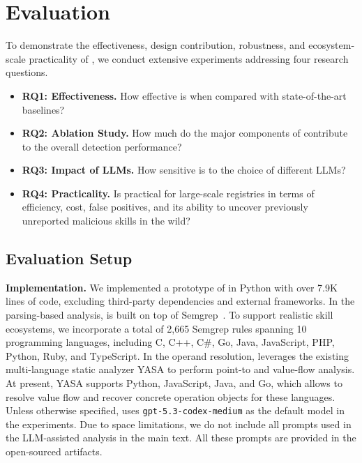 \section{Evaluation}

To demonstrate the effectiveness, design contribution, robustness, and ecosystem-scale practicality of \toolname, we conduct extensive experiments addressing four research questions.

\begin{itemize}[leftmargin=15pt]
    \item \textbf{RQ1: Effectiveness.}  
    How effective is \toolname when compared with state-of-the-art baselines?

    \item \textbf{RQ2: Ablation Study.}  
    How much do the major components of \toolname contribute to the overall detection performance?

    \item \textbf{RQ3: Impact of LLMs.}  
    How sensitive is \toolname to the choice of different LLMs?

    \item \textbf{RQ4: Practicality.}  
    Is \toolname practical for large-scale registries in terms of efficiency, cost, false positives, and its ability to uncover previously unreported malicious skills in the wild?
\end{itemize}

\subsection{Evaluation Setup}
\label{sec:eval-setup}

\noindent \textbf{Implementation.}
We implemented a prototype of \toolname in Python with over 7.9K lines of code, excluding third-party dependencies and external frameworks. In the parsing-based analysis, \toolname is built on top of Semgrep~\cite{semgrep}. To support realistic skill ecosystems, we incorporate a total of 2,665 Semgrep rules spanning 10 programming languages, including C, C++, C\#, Go, Java, JavaScript, PHP, Python, Ruby, and TypeScript. 
In the operand resolution, \toolname leverages the existing multi-language static analyzer YASA to perform point-to and value-flow analysis. At present, YASA supports Python, JavaScript, Java, and Go, which allows \toolname to resolve value flow and recover concrete operation objects for these languages. 
Unless otherwise specified, \toolname uses \texttt{gpt-5.3-codex-medium} as the default model in the experiments.
Due to space limitations, we do not include all prompts used in the LLM-assisted analysis in the main text. All these prompts are provided in the open-sourced artifacts.

